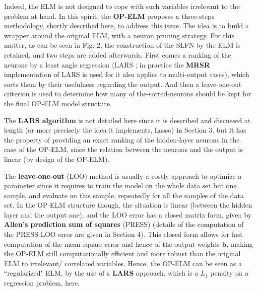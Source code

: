 Indeed, the ELM is not designed to cope with such variables irrelevant to the problem at hand. In this spirit, the \textbf{OP-ELM} proposes a three-steps methodology, shortly described here, to address this issue. The idea is to build a wrapper around the original ELM, with a neuron pruning strategy. For this matter, as can be seen in Fig. 2, the construction of the SLFN by the ELM is retained, and two steps are added afterwards. First comes a ranking of the neurons by a least angle regression (LARS \cite{EfronHastie2004-32498}; in practice the \textbf{MRSR} \cite{SimiläTikka2005-32497} implementation of LARS is used for it also applies to multi-output cases), which sorts them by their usefulness regarding the output. And then a leave-one-out criterion is used to determine how many of the-sorted-neurons should be kept for the final OP-ELM model structure.

The \textbf{LARS algorithm} is not detailed here since it is described and discussed at length (or more precisely the idea it implements, Lasso) in Section 3, but it has the property of providing an exact ranking of the hidden-layer neurons in the case of the OP-ELM, since the relation between the neurons and the output is linear (by design of the OP-ELM).

The \textbf{leave-one-out} (LOO) method is usually a costly approach to optimize a parameter since it requires to train the model on the whole data set but one sample, and evaluate on this sample, repeatedly for all the samples of the data set. In the OP-ELM structure though, the situation is linear (between the hidden layer and the output one), and the LOO error has a closed matrix form, given by \textbf{Allen's prediction sum of squares} (PRESS) \cite{MADavid1972} (details of the computation of the PRESS LOO error are given in Section 4). This closed form allows for fast computation of the mean square error and hence of the output weights $\bm b$, making the OP-ELM still computationally efficient and more robust than the original ELM to irrelevant/ correlated variables. Hence, the OP-ELM can be seen as a ``regularized" ELM, by the use of a \textbf{LARS} approach, which is a $L_1$ penalty on a regression problem, here.

